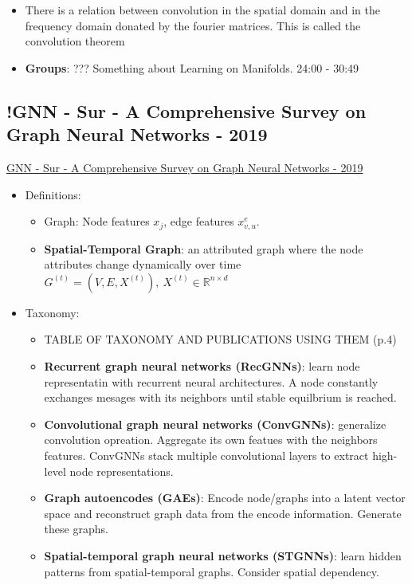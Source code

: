 \begin{itemize}
\begin{itemize}[noitemsep,nolistsep]
		\item There is a relation between convolution in the spatial domain and in the frequency domain donated by the fourier matrices. This is called the convolution theorem
		\item \textbf{Groups}: ??? Something about Learning on Manifolds. 24:00 - 30:49
	\end{itemize}
\end{itemize}

\subsection{!GNN - Sur - A Comprehensive Survey on Graph Neural Networks - 2019}
\href{https://arxiv.org/abs/1901.00596}{GNN - Sur - A Comprehensive Survey on Graph Neural Networks - 2019}
\begin{itemize}[noitemsep,nolistsep]
	\item Definitions:
	\begin{itemize}[noitemsep,nolistsep]
		\item Graph: Node features $x_j$, edge features $x^e_{v,u}$.
		\item \textbf{Spatial-Temporal Graph}: an attributed graph where the node attributes change dynamically over time $G^{(t)} = (V,E,X^{(t)}),\ X^{(t)} \in \mathbb{R}^{n \times d}$
	\end{itemize}
	\item Taxonomy:
	\begin{itemize}[noitemsep,nolistsep]
		\item TABLE OF TAXONOMY AND PUBLICATIONS USING THEM (p.4)
		\item \textbf{Recurrent graph neural networks (RecGNNs)}: learn node representatin with recurrent neural architectures. A node constantly exchanges mesages with its neighbors until stable equilbrium is reached.
		\item \textbf{Convolutional graph neural networks (ConvGNNs)}: generalize convolution opreation. Aggregate its own featues with the neighbors features. ConvGNNs stack multiple convolutional layers to extract high-level node representations.
		\item \textbf{Graph autoencodes (GAEs)}: Encode node/graphs into a latent vector space and reconstruct graph data from the encode information. Generate these graphs.
		\item \textbf{Spatial-temporal graph neural networks (STGNNs)}: learn hidden patterns from spatial-temporal graphs. Consider spatial dependency.
	\end{itemize}

\end{itemize}

